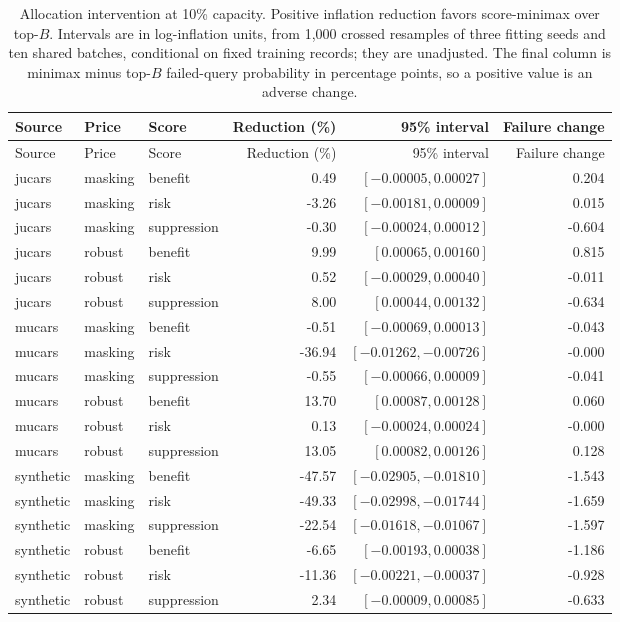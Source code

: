 \documentclass[11pt]{article}
\begin{document}
\small
\begin{longtable}{lllrrr}
\caption{Allocation intervention at 10\% capacity. Positive inflation
reduction favors score-minimax over top-$B$. Intervals are in log-inflation
units, from 1,000 crossed resamples of three fitting seeds and ten shared
batches, conditional on fixed training records; they are unadjusted.
The final column is minimax minus top-$B$ failed-query probability in percentage
points, so a positive value is an adverse change.}\label{tab:allocation}\\
\toprule Source & Price & Score & Reduction (\%) & 95\% interval & Failure change\\
\midrule\endfirsthead
\toprule Source & Price & Score & Reduction (\%) & 95\% interval & Failure change\\
\midrule\endhead
jucars & masking & benefit & 0.49 & $[-0.00005,0.00027]$ & 0.204\\
jucars & masking & risk & -3.26 & $[-0.00181,0.00009]$ & 0.015\\
jucars & masking & suppression & -0.30 & $[-0.00024,0.00012]$ & -0.604\\
jucars & robust & benefit & 9.99 & $[0.00065,0.00160]$ & 0.815\\
jucars & robust & risk & 0.52 & $[-0.00029,0.00040]$ & -0.011\\
jucars & robust & suppression & 8.00 & $[0.00044,0.00132]$ & -0.634\\
mucars & masking & benefit & -0.51 & $[-0.00069,0.00013]$ & -0.043\\
mucars & masking & risk & -36.94 & $[-0.01262,-0.00726]$ & -0.000\\
mucars & masking & suppression & -0.55 & $[-0.00066,0.00009]$ & -0.041\\
mucars & robust & benefit & 13.70 & $[0.00087,0.00128]$ & 0.060\\
mucars & robust & risk & 0.13 & $[-0.00024,0.00024]$ & -0.000\\
mucars & robust & suppression & 13.05 & $[0.00082,0.00126]$ & 0.128\\
synthetic & masking & benefit & -47.57 & $[-0.02905,-0.01810]$ & -1.543\\
synthetic & masking & risk & -49.33 & $[-0.02998,-0.01744]$ & -1.659\\
synthetic & masking & suppression & -22.54 & $[-0.01618,-0.01067]$ & -1.597\\
synthetic & robust & benefit & -6.65 & $[-0.00193,0.00038]$ & -1.186\\
synthetic & robust & risk & -11.36 & $[-0.00221,-0.00037]$ & -0.928\\
synthetic & robust & suppression & 2.34 & $[-0.00009,0.00085]$ & -0.633\\
\bottomrule
\end{longtable}
\normalsize
\end{document}
